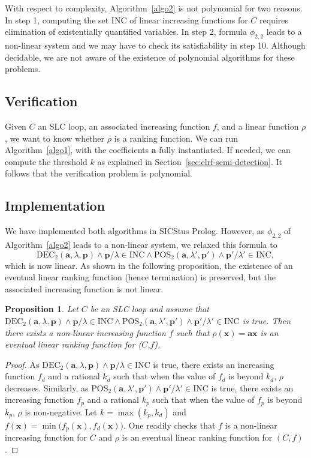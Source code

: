 \documentclass{acm_proc_article-sp}
\newtheorem{proposition}[theorem]{Proposition}
\newcommand{\dec}{\mathrm{DEC}}
\newcommand{\pos}{\mathrm{POS}}
\newcommand{\inc}{\mathrm{INC}}
\begin{document}
With respect to complexity,
Algorithm~\ref{algo2}  is not polynomial for two reasons.
In step 1, computing the set $\inc$ of linear increasing functions for $C$
requires elimination of existentially quantified variables.
In step 2, formula $\phi_{2,2}$  leads to a non-linear system
and we may have to check its satisfiability in step 10.
Although decidable, we are not aware of the existence of
polynomial algorithms for these problems.

\subsection{Verification}
\label{sec:verification}

Given $C$ an SLC loop, an associated increasing
function $f$, and a linear function $\rho$, we want to know whether
$\rho$ is a ranking function.
We can run Algorithm~\ref{algo1}, with the coefficients $\mathbf{a}$
fully instantiated. If needed, we can compute the threshold $k$
as explained in Section~\ref{sec:elrf-semi-detection}.
It follows that the verification problem is polynomial.

\subsection{Implementation}
\label{sec:implementation}

We  have implemented both algorithms in SICStus Prolog.
However, as $\phi_{2,2}$ of Algorithm~\ref{algo2}
leads to a non-linear system, we relaxed this formula to
\[
  \dec_2(\mathbf{a}, \lambda, \mathbf{p})
    \land \mathbf{p} / \lambda \in \inc
    \land \pos_2(\mathbf{a},\lambda',\mathbf{p'})
    \land \mathbf{p'} / \lambda' \in \inc,
\]
which is now linear. As shown in the following proposition, the existence
of an eventual linear ranking function (hence termination) is preserved,
but the associated increasing function is not linear.

\begin{proposition}
Let $C$ be an SLC loop and assume that
\(
  \dec_2(\mathbf{a},\lambda,\mathbf{p})
    \land \mathbf{p} / \lambda \in \inc
    \land \pos_2(\mathbf{a},\lambda',\mathbf{p'})
    \land \mathbf{p'} / \lambda' \in \inc
\)
is true.
Then there exists a non-linear increasing function $f$ such that
$\rho(\mathbf{x})= \mathbf{a} \mathbf{x}$
is an eventual linear ranking function for ($C$,$f$).
\end{proposition}

\begin{proof}
As $\dec_2(\mathbf{a},\lambda,\mathbf{p})  \land \mathbf{p}/\lambda \in \inc$
is true, there exists an increasing function $f_d$ and a rational
$k_d$ such that when the value of $f_d$ is beyond $k_d$, $\rho$
decreases.
Similarly, as
$\pos_2(\mathbf{a}, \lambda',\mathbf{p'}) \land \mathbf{p'}/\lambda' \in \inc$
is true, there exists an increasing function $f_p$ and a rational
$k_p$ such that when the value of $f_p$ is beyond $k_p$, $\rho$ is
non-negative.
Let $k = \max(k_p, k_d)$ and
$f(\mathbf{x}) = \min\bigl(f_p(\mathbf{x}), f_d(\mathbf{x})\bigr)$.
One readily checks that $f$ is a non-linear increasing function for $C$
and $\rho$ is an eventual linear ranking function for $(C, f)$.
\end{proof}
\end{document}
